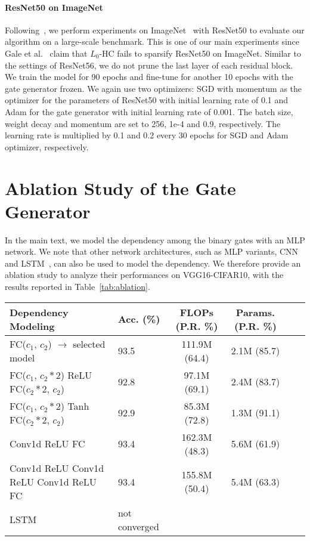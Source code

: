 \documentclass[runningheads, envcountsame, a4paper]{llncs}
\begin{document}
\paragraph{ResNet50 on ImageNet}
Following~\cite{gale2019state}, we perform experiments on ImageNet~\cite{deng2009imagenet} with ResNet50 to evaluate our algorithm on a large-scale benchmark. This is one of our main experiments since Gale et al.~\cite{gale2019state} claim that $L_0$-HC fails to sparsify ResNet50 on ImageNet. Similar to the settings of ResNet56, we do not prune the last layer of each residual block. We train the model for 90 epochs and fine-tune for another 10 epochs with the gate generator frozen. We again use two optimizers: SGD with momentum as the optimizer for the parameters of ResNet50 with initial learning rate of 0.1 and Adam for the gate generator with initial learning rate of 0.001. The batch size, weight decay and momentum are set to 256, 1e-4 and 0.9, respectively. The learning rate is multiplied by 0.1 and 0.2 every 30 epochs for SGD and Adam optimizer, respectively. 

\section{Ablation Study of the Gate Generator}
In the main text, we model the dependency among the binary gates with an MLP network. We note that other network architectures, such as MLP variants, CNN and LSTM~\cite{gers1999learning}, can also be used to model the dependency. We therefore provide an ablation study to analyze their performances on VGG16-CIFAR10, with the results reported in Table~\ref{tab:ablation}.

\begin{table*}[ht!]
  \small
  \centering
  \caption{Ablation study of the gate generator architecture with VGG16 on CIFAR10. ``FLOPs": pruning ratio in FLOPs. ``Params.": prune ratio in parameters. }
  \begin{tabular}{l l c c c c}\toprule
      Dependency Modeling & Acc. (\%) & FLOPs (P.R. \%)  & Params. (P.R. \%)  \\\hline
       FC($c_1$, $c_2$) $\to$ selected model & 93.5 & 111.9M (64.4) & 2.1M (85.7) \\
       FC($c_1$, $c_2 * 2$) ReLU FC($c_2 * 2$, $c_2$) & 92.8 & 97.1M (69.1) & 2.4M (83.7) \\
       FC($c_1$, $c_2 * 2$) Tanh FC($c_2 * 2$, $c_2$) & 92.9 & 85.3M (72.8) &  1.3M (91.1) \\
       Conv1d ReLU FC & 93.4 & 162.3M (48.3) & 5.6M (61.9) \\
       Conv1d ReLU Conv1d ReLU Conv1d ReLU FC & 93.4 & 155.8M (50.4) & 5.4M (63.3) \\
       LSTM & not converged\\
       \bottomrule
  \end{tabular}
  \label{tab:ablation}
\end{table*}
\end{document}
